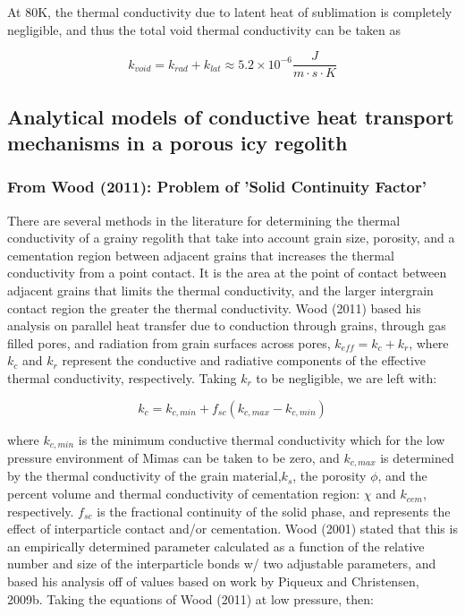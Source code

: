 \documentclass[11pt]{article} %
\begin{document}
	At 80K, the thermal conductivity due to latent heat of sublimation is completely negligible, and thus the total void thermal conductivity can be taken as 
	
	\begin{equation}
	k_{void} = k_{rad} + k_{lat} \approx 5.2\times10^{-6} \frac{J}{m \cdot s \cdot K}
	\end{equation}

\subsection{Analytical models of conductive heat transport mechanisms in a porous icy regolith}
\subsubsection{From Wood (2011): Problem of 'Solid Continuity Factor'}
	There are several methods in the literature for determining the thermal conductivity of a grainy regolith that take into account grain size, porosity, and a cementation region between adjacent grains that increases the thermal conductivity from a point contact. It is the area at the point of contact between adjacent grains that limits the thermal conductivity, and the larger intergrain contact region the greater the thermal conductivity. Wood (2011) based his analysis on parallel heat transfer due to conduction through grains, through gas filled pores, and radiation from grain surfaces across pores, $k_{eff} = k_{c} + k_{r}$, where $k_{c}$ and $k_{r}$ represent the conductive and radiative components of the effective thermal conductivity, respectively. Taking $k_{r}$ to be negligible, we are left with:
	
	\begin{equation}
	k_{c} = k_{c,min} +f_{sc}(k_{c,max}-k_{c,min})
	\end{equation}
	
	where $k_{c,min}$ is the minimum conductive thermal conductivity which for the low pressure environment of Mimas can be taken to be zero, and $k_{c,max}$ is determined by the thermal conductivity of the grain material,$ k_{s}$, the porosity $\phi$, and the percent volume and thermal conductivity of cementation region: $\chi$ and $k_{cem}$, respectively. $f_{sc}$ is the fractional continuity of the solid phase, and represents the effect of interparticle contact and/or cementation. Wood (2001) stated that this is an empirically determined parameter calculated as a function of the relative number and size of the interparticle bonds w/ two adjustable parameters, and based his analysis off of values based on work by Piqueux and Christensen, 2009b. Taking the equations of Wood (2011) at low pressure, then:
	
\end{document}
